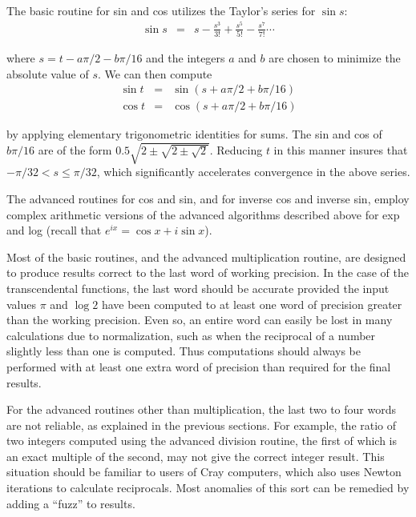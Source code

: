 The basic routine for sin and cos utilizes the Taylor's series for
$\sin s$:
\begin{eqnarray*} 
\sin s &=& s - \frac{s^3}{3!} + \frac{s^5}{5!} - \frac{s^7}{7!} \cdots
\end{eqnarray*}
 
\noindent
where $s = t - a \pi / 2 - b \pi / 16$ and the integers $a$ and
$b$ are chosen to minimize the absolute value of $s$.  We can then
compute
\begin{eqnarray*} 
\sin t &=& \sin (s + a \pi / 2 + b \pi / 16) \\
\cos t &=& \cos (s + a \pi / 2 + b \pi / 16)
\end{eqnarray*}
 
\noindent
by applying elementary trigonometric identities for sums.  The sin and
cos of $b \pi / 16$ are of the form $0.5 \sqrt{2 \pm \sqrt{2 \pm
\sqrt{2}}}$.  Reducing $t$ in this manner insures that $-\pi / 32 < s
\leq \pi / 32$, which significantly accelerates convergence in the
above series.

The advanced routines for cos and sin, and for inverse cos and inverse
sin, employ complex arithmetic versions of the advanced algorithms
described above for exp and log (recall that $e^{ix} = \cos x + i \sin
x$).

\vspace{2ex}

Most of the basic routines, and the advanced multiplication routine,
are designed to produce results correct to the last word of working
precision.  In the case of the transcendental functions, the last word
should be accurate provided the input values $\pi$ and $\log 2$ have
been computed to at least one word of precision greater than the
working precision.  Even so, an entire word can easily be lost in many
calculations due to normalization, such as when the reciprocal of a
number slightly less than one is computed.  Thus computations should
always be performed with at least one extra word of precision than
required for the final results.

For the advanced routines other than multiplication, the last two to
four words are not reliable, as explained in the previous sections.
For example, the ratio of two integers computed using the advanced
division routine, the first of which is an exact multiple of the
second, may not give the correct integer result.  This situation
should be familiar to users of Cray computers, which also uses Newton
iterations to calculate reciprocals.  Most anomalies of this sort can
be remedied by adding a ``fuzz'' to results.

